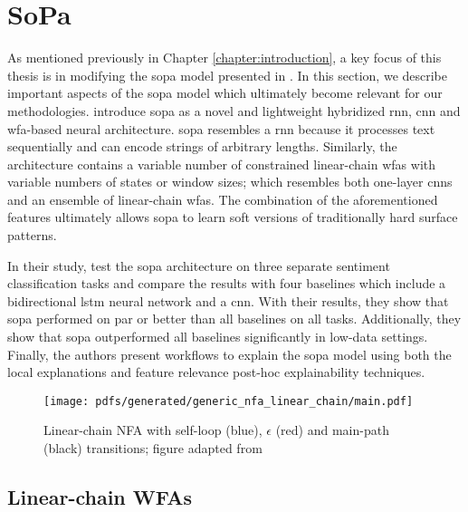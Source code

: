 \section{SoPa}

\label{section:sopa}

As mentioned previously in Chapter \ref{chapter:introduction}, a key focus of
this thesis is in modifying the \ac{sopa} model
presented in \citet{schwartz2018sopa}. In this section, we describe important
aspects of the \ac{sopa} model which ultimately become relevant for our
methodologies. \citet{schwartz2018sopa} introduce \ac{sopa} as a novel and
lightweight hybridized \ac{rnn}, \ac{cnn} and \ac{wfa}-based neural architecture. \ac{sopa}
resembles a \ac{rnn} because it processes text sequentially and can encode strings of
arbitrary lengths. Similarly, the architecture contains a variable number of
constrained linear-chain \ac{wfas} with variable numbers of states or window sizes;
which resembles both one-layer \ac{cnn}s and an ensemble of linear-chain \ac{wfas}. The
combination of the aforementioned features ultimately allows \ac{sopa} to learn soft
versions of traditionally hard surface patterns.

In their study, \citet{schwartz2018sopa} test the \ac{sopa} architecture on three
separate sentiment classification tasks and compare the results with four
baselines which include a bidirectional \ac{lstm} neural network and a \ac{cnn}.
With their results, they show that \ac{sopa} performed on par or better than all
baselines on all tasks. Additionally, they show that \ac{sopa} outperformed all
baselines significantly in low-data settings. Finally, the authors present
workflows to explain the \ac{sopa} model using both the local explanations and
feature relevance post-hoc explainability techniques.

\begin{figure}[t]
  \centering
  \texttt{[image: pdfs/generated/generic\_nfa\_linear\_chain/main.pdf]}
  \caption{Linear-chain NFA with
    self-loop (blue), $\epsilon$ (red) and main-path (black) transitions; figure
    adapted from \citet{schwartz2018sopa}}
  \label{fig:fa}
\end{figure}

\subsection{Linear-chain WFAs}

\label{section:sopa_lc_wfa}

